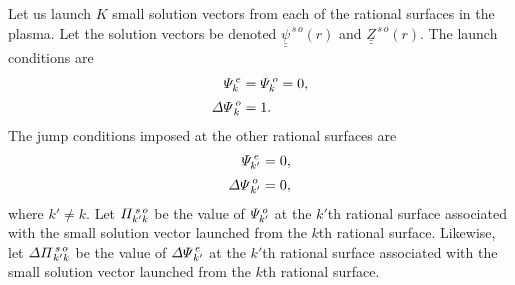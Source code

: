 \documentclass[12pt,prb,aps,notitlepage]{revtex4-1}
\begin{document}
Let us launch $K$ small solution vectors from each of the rational surfaces in the plasma. Let the solution vectors 
be denoted  $\underline{\underline{\psi}}^{\,s\,o}(r)$ and $\underline{\underline{Z}}^{\,s\,o}(r)$. The launch conditions are
\begin{align}
{\mit\Psi}_k^{\,e} &= {\mit\Psi}_k^{\,o} = 0,\\[0.5ex]
{\mit\Delta\Psi}_k^{\,o}& = 1.
\end{align}
The jump conditions imposed at the other rational surfaces are
\begin{align}
{\mit\Psi}_{k'}^{\,e} &= 0,\\[0.5ex]
{\mit\Delta\Psi}_{k'}^{\,o} &= 0,
\end{align}
where $k'\neq k$. 
Let ${\mit\Pi}_{k'k}^{\,s\,o}$ be the value of ${\mit\Psi}_{k'}^{\,o}$ at the $k'$th rational surface associated with the small solution vector launched from the $k$th rational surface. Likewise, let ${\mit\Delta\Pi}_{k'k}^{\,s\,o}$ be the value of ${\mit\Delta\Psi}_{k'}^{\,e}$
at the $k'$th rational surface associated with the small solution vector launched from the $k$th rational surface. 
\end{document}
